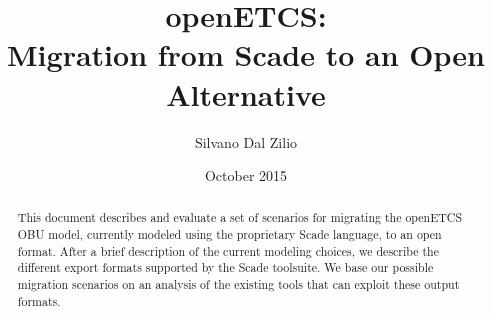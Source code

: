 \documentclass{template/openetcs_report}
\begin{document}
\frontmatter
{}




\title{openETCS:\\ Migration from Scade to an Open Alternative}

\subtitle{}

\date{October 2015}


\techassessorname{}
\techassessoraffil{}

\qualityassessorname{}
\qualityassessoraffil{}

\approvalname{}
\approvalaffil{}


\author{Silvano Dal Zilio}

  




\begin{abstract}
  This document describes and evaluate a set of scenarios for
  migrating the openETCS OBU model, currently modeled using the
  proprietary Scade language, to an open format. After a brief
  description of the current modeling choices, we describe the
  different export formats supported by the Scade toolsuite. We base
  our possible migration scenarios on an analysis of the existing
  tools that can exploit these output formats.
\end{abstract}
\end{document}
